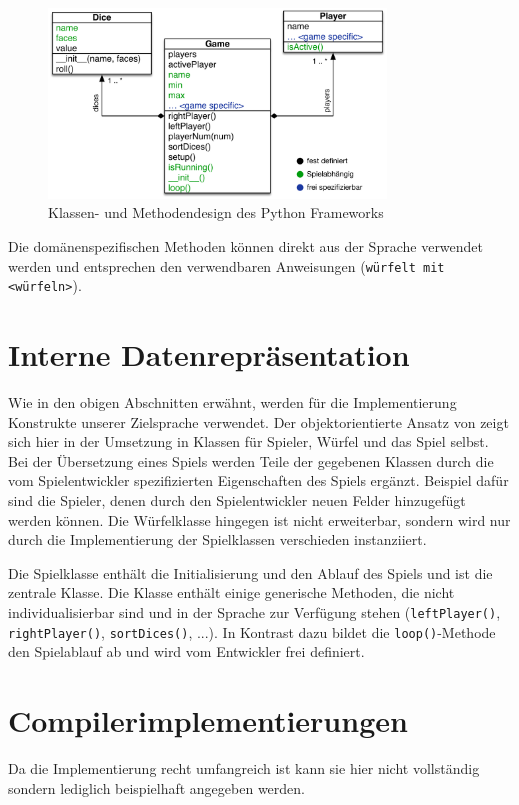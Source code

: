     \begin{figure}[ht]
    	\centering
        \includegraphics[width=0.8\textwidth]{Python-UML.pdf}
    	\caption{Klassen- und Methodendesign des Python Frameworks}
    	\label{python-uml}
    \end{figure}

    Die domänenspezifischen Methoden können direkt aus der Sprache verwendet werden und entsprechen den verwendbaren Anweisungen (\texttt{würfelt mit <würfeln>}).

\section{Interne Datenrepräsentation}
\label{sec:interne_datenreprasentation}
    Wie in den obigen Abschnitten erwähnt, werden für die Implementierung Konstrukte unserer Zielsprache verwendet. Der objektorientierte Ansatz von \dg zeigt sich hier in der Umsetzung in Klassen für Spieler, Würfel und das Spiel selbst. Bei der Übersetzung eines Spiels werden Teile der gegebenen Klassen durch die vom Spielentwickler spezifizierten Eigenschaften des Spiels ergänzt. Beispiel dafür sind die Spieler, denen durch den Spielentwickler neuen Felder hinzugefügt werden können. Die Würfelklasse hingegen ist nicht erweiterbar, sondern wird nur durch die Implementierung der Spielklassen verschieden instanziiert.

    Die Spielklasse enthält die Initialisierung und den Ablauf des Spiels und ist die zentrale Klasse. Die Klasse enthält einige generische Methoden, die nicht individualisierbar sind und in der Sprache zur Verfügung stehen (\texttt{leftPlayer()}, \texttt{rightPlayer()}, \texttt{sortDices()}, ...). In Kontrast dazu bildet die \texttt{loop()}-Methode den Spielablauf ab und wird vom Entwickler frei definiert.

\section{Compilerimplementierungen}
\label{sec:compilerimplementierungen}
	Da die Implementierung recht umfangreich ist kann sie hier nicht vollständig sondern lediglich beispielhaft angegeben werden.

